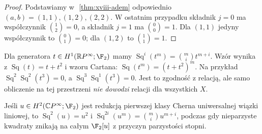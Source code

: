 \begin{proof}
Podstawiamy w\,~\ref{thm:xviii-adem} odpowiednio
$(a,b)=(1,1),(1,2),(2,2)$. W ostatnim przypadku
składnik $j=0$ ma współczynnik
$\binom{1}{2}=0$, a składnik $j=1$ ma
$\binom{0}{0}=1$. Dla $(1,1)$ jedyny współczynnik to
$\binom{0}{1}=0$; dla $(1,2)$ to $\binom{1}{1}=1$.
\end{proof}
\begin{przyklad}
Dla generatora $t\in H^1(\mathbb RP^\infty;\F_2)$ mamy
$\operatorname{Sq}^i(t^m)=\binom mi t^{m+i}$.
Wzór wynika z $\operatorname{Sq}(t)=t+t^2$ i
wzoru Cartana: $\operatorname{Sq}(t^m)=(t+t^2)^m$.
Na przykład
$\operatorname{Sq}^2\operatorname{Sq}^2(t^3)=0$,
a $\operatorname{Sq}^3\operatorname{Sq}^1(t^3)=0$.
Jest to zgodność z relacją, ale samo obliczenie na tej
przestrzeni \emph{nie dowodzi} relacji dla wszystkich $X$.
\end{przyklad}
\begin{przyklad}
Jeśli $u\in H^2(\mathbb CP^\infty;\F_2)$ jest redukcją
pierwszej klasy Cherna uniwersalnej wiązki liniowej, to
$\operatorname{Sq}^2(u)=u^2$ i
$\operatorname{Sq}^{2i}(u^m)=\binom mi u^{m+i}$,
podczas gdy nieparzyste kwadraty znikają na całym
$\F_2[u]$ z przyczyn parzystości stopni.
\end{przyklad}


